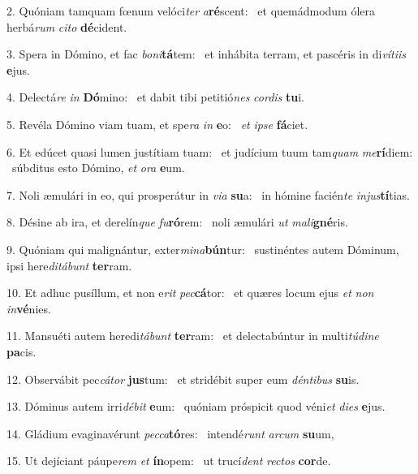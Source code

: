 2. Quóniam tamquam fœnum velóci\textit{ter} \textit{a}\textbf{ré}scent: \ast\  et quemádmodum ólera herbá\textit{rum} \textit{ci}\textit{to} \textbf{dé}cident.\

3. Spera in Dómino, et fac \textit{bo}\textit{ni}\textbf{tá}tem: \ast\  et inhábita terram, et pascéris in di\textit{ví}\textit{ti}\textit{is} \textbf{e}jus.\

4. Delectá\textit{re} \textit{in} \textbf{Dó}mino: \ast\  et dabit tibi petitió\textit{nes} \textit{cor}\textit{dis} \textbf{tu}i.\

5. Revéla Dómino viam tuam, et spe\textit{ra} \textit{in} \textbf{e}o: \ast\  \textit{et} \textit{ip}\textit{se} \textbf{fá}ciet.\

6. Et edúcet quasi lumen justítiam tuam: \dag\  et judícium tuum tam\textit{quam} \textit{me}\textbf{rí}diem: \ast\  súbditus esto Dómino, \textit{et} \textit{o}\textit{ra} \textbf{e}um.\

7. Noli æmulári in eo, qui prosperátur in \textit{vi}\textit{a} \textbf{su}a: \ast\  in hómine facién\textit{te} \textit{in}\textit{jus}\textbf{tí}tias.\

8. Désine ab ira, et derelín\textit{que} \textit{fu}\textbf{ró}rem: \ast\  noli æmulári \textit{ut} \textit{ma}\textit{li}\textbf{gné}ris.\

9. Quóniam qui malignántur, exter\textit{mi}\textit{na}\textbf{bún}tur: \ast\  sustinéntes autem Dóminum, ipsi here\textit{di}\textit{tá}\textit{bunt} \textbf{ter}ram.\

10. Et adhuc pusíllum, et non e\textit{rit} \textit{pec}\textbf{cá}tor: \ast\  et quæres locum ejus \textit{et} \textit{non} \textit{in}\textbf{vé}nies.\

11. Mansuéti autem heredi\textit{tá}\textit{bunt} \textbf{ter}ram: \ast\  et delectabúntur in multi\textit{tú}\textit{di}\textit{ne} \textbf{pa}cis.\

12. Observábit pec\textit{cá}\textit{tor} \textbf{jus}tum: \ast\  et stridébit super eum \textit{dén}\textit{ti}\textit{bus} \textbf{su}is.\

13. Dóminus autem irri\textit{dé}\textit{bit} \textbf{e}um: \ast\  quóniam próspicit quod véni\textit{et} \textit{di}\textit{es} \textbf{e}jus.\

14. Gládium evaginavérunt \textit{pec}\textit{ca}\textbf{tó}res: \ast\  intendé\textit{runt} \textit{ar}\textit{cum} \textbf{su}um,\

15. Ut dejíciant páupe\textit{rem} \textit{et} \textbf{ín}opem: \ast\  ut trucí\textit{dent} \textit{rec}\textit{tos} \textbf{cor}de.\

